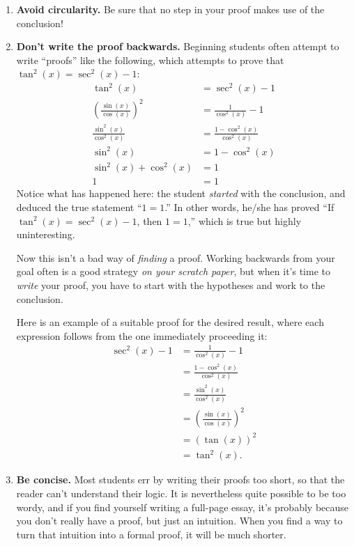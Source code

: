 \documentclass[11pt]{article}
\begin{document}
\begin{enumerate}
\item \textbf{Avoid circularity.}  Be sure that no step in your proof makes use of the conclusion!
        
\item \textbf{Don't write the proof backwards.}
        Beginning students often attempt to write ``proofs'' like the following, which attempts to prove that $\tan^2(x)  = \sec^2(x) - 1$:
\begin{align*}
 \tan^2(x) & = \sec^2(x) - 1 \\
\left(\frac{\sin(x)}{\cos(x)}\right)^2 & = \frac{1}{\cos^2(x)} - 1 \\
\frac{\sin^2(x)}{\cos^2(x)} & =  \frac{1-\cos^2(x)}{\cos^2(x)} \\
\sin^2(x) & = 1-\cos^2(x) \\
\sin^2(x) + \cos^2(x) & = 1 \\
1 & = 1
\end{align*}        
        Notice what has happened here:  the student \emph{started} with the conclusion,
        and deduced the true statement ``$1=1$.''
        In other words, he/she has proved ``If $\tan^2(x) = \sec^2(x) - 1$, then $1=1$,''
        which is true but highly uninteresting.
        
        Now this isn't a bad way of \emph{finding} a proof.
        Working backwards from your goal often is a good strategy \emph{on your scratch paper},
        but when it's time to \emph{write} your proof,
        you have to start with the hypotheses and work to the conclusion.

Here is an example of a suitable proof for the desired result, where each expression follows from the one immediately proceeding it:
\begin{align*}
\sec^2(x) - 1 & = \frac{1}{\cos^2(x)} - 1\\
& = \frac{1-\cos^2(x)}{\cos^2(x)} \\
& = \frac{\sin^2(x)}{\cos^2(x)} \\
& = \left(\frac{\sin(x)}{\cos(x)}\right)^2 \\
& = \left(\tan(x)\right)^2 \\
& = \tan^2(x).
\end{align*}

\item \textbf{Be concise.}
        Most students err by writing their proofs too short,
        so that the reader can't understand their logic.
        It is nevertheless quite possible to be too wordy,
        and if you find yourself writing a full-page essay,
        it's probably because you don't really have a proof,
        but just an intuition.
        When you find a way to turn that intuition into a formal proof,
        it will be much shorter.


\end{enumerate}
\end{document}
